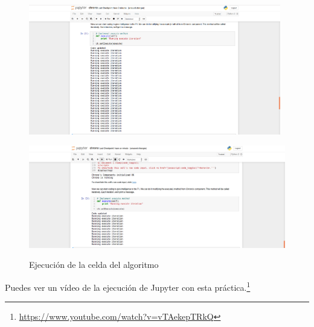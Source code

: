 \begin{figure}[H]
    \centering
	\begin{minipage}[h]{.48\linewidth}
    \centering
    \includegraphics[width=0.98\textwidth]{figures/ejecucion_chrono_jupyter.png}
		\caption{Ejecución de la celda del algoritmo}
		\label{fig.ecj}
	 \end{minipage}
    \begin{minipage}[h]{.48\linewidth}
    \centering
    \includegraphics[width=0.98\linewidth]{figures/stop_chrono_jupyter.png}
		\label{fig:scj}
	\end{minipage}
\end{figure}

Puedes ver un vídeo de la ejecución de Jupyter con esta práctica.\footnote{\url{https://www.youtube.com/watch?v=vTAekepTRkQ}}